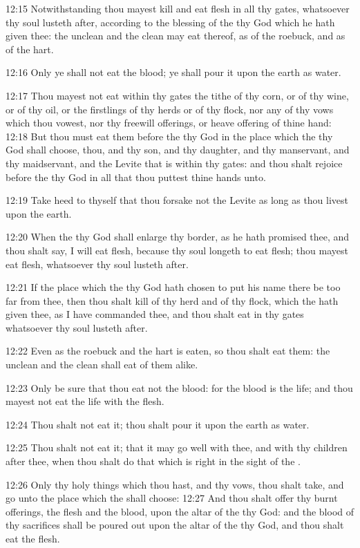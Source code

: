 12:15 Notwithstanding thou mayest kill and eat flesh in all thy gates,
whatsoever thy soul lusteth after, according to the blessing of the
\LORD thy God which he hath given thee: the unclean and the clean may
eat thereof, as of the roebuck, and as of the hart.

12:16 Only ye shall not eat the blood; ye shall pour it upon the earth
as water.

12:17 Thou mayest not eat within thy gates the tithe of thy corn, or
of thy wine, or of thy oil, or the firstlings of thy herds or of thy
flock, nor any of thy vows which thou vowest, nor thy freewill
offerings, or heave offering of thine hand: 12:18 But thou must eat
them before the \LORD thy God in the place which the \LORD thy God shall
choose, thou, and thy son, and thy daughter, and thy manservant, and
thy maidservant, and the Levite that is within thy gates: and thou
shalt rejoice before the \LORD thy God in all that thou puttest thine
hands unto.

12:19 Take heed to thyself that thou forsake not the Levite as long as
thou livest upon the earth.

12:20 When the \LORD thy God shall enlarge thy border, as he hath
promised thee, and thou shalt say, I will eat flesh, because thy soul
longeth to eat flesh; thou mayest eat flesh, whatsoever thy soul
lusteth after.

12:21 If the place which the \LORD thy God hath chosen to put his name
there be too far from thee, then thou shalt kill of thy herd and of
thy flock, which the \LORD hath given thee, as I have commanded thee,
and thou shalt eat in thy gates whatsoever thy soul lusteth after.

12:22 Even as the roebuck and the hart is eaten, so thou shalt eat
them: the unclean and the clean shall eat of them alike.

12:23 Only be sure that thou eat not the blood: for the blood is the
life; and thou mayest not eat the life with the flesh.

12:24 Thou shalt not eat it; thou shalt pour it upon the earth as
water.

12:25 Thou shalt not eat it; that it may go well with thee, and with
thy children after thee, when thou shalt do that which is right in the
sight of the \LORD.

12:26 Only thy holy things which thou hast, and thy vows, thou shalt
take, and go unto the place which the \LORD shall choose: 12:27 And
thou shalt offer thy burnt offerings, the flesh and the blood, upon
the altar of the \LORD thy God: and the blood of thy sacrifices shall
be poured out upon the altar of the \LORD thy God, and thou shalt eat
the flesh.

